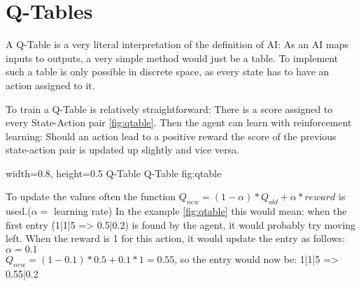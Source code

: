 \section{Q-Tables}
\label{sec:QTable}
A Q-Table is a very literal interpretation of the definition of AI: As an AI maps inputs to outputs, a very simple method would just be a table. To implement such a table is only possible in discrete space, as every state has to have an action assigned to it.

To train a Q-Table is relatively straightforward: There is a score assigned to every State-Action pair \autoref{fig:qtable}. Then the agent can learn with reinforcement learning: Should an action lead to a positive reward the score of the previous state-action pair is updated up slightly and vice versa.

    {width=0.8\textwidth, height=0.5\textheight} %
    {Q-Table}   %
    {Q-Table}   %
    {fig:qtable}    %

To update the values often the function $Q_{new}=(1-\alpha)*Q_{old}+\alpha*reward$ is used.($\alpha=$ learning rate)
In the example \autoref{fig:qtable} this would mean: when the first entry (1|1|5 => 0.5|0.2) is found by the agent, it would probably try moving left. When the reward is 1 for this action, it would update the entry as follows: $\alpha=0.1$\\$Q_{new}=(1-0.1)*0.5+0.1*1=0.55$, so the entry would now be: 1|1|5 => 0.55|0.2

